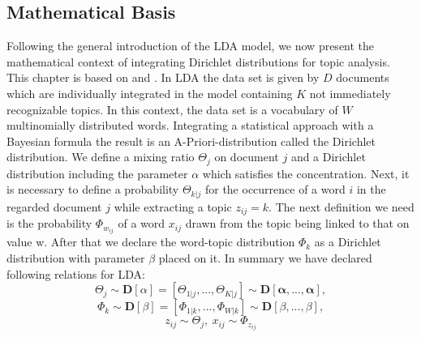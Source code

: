 \subsection{Mathematical Basis}
Following the general introduction of the LDA model, we now present the mathematical context of integrating Dirichlet distributions for topic analysis. This chapter is based on \citet{newman2009distributed} and \citet{teh2006hierarchical, teh2004sharing}. In LDA the data set is given by $D$ documents which are individually integrated in the model containing $K$ not immediately recognizable topics. In this context, the data set is a vocabulary of $W$ multinomially distributed words. Integrating a statistical approach with a Bayesian formula the result is an A-Priori-distribution called the Dirichlet distribution. We define a mixing ratio $\Theta_j$ on document $j$ and a Dirichlet distribution including the parameter $\alpha$ which satisfies the concentration.
Next, it is necessary to define a probability $\Theta_{k|j}$ for the occurrence of a word $i$ in the regarded document $j$ while extracting a topic $z_{ij}=k$. The next definition we need is the probability $\Phi_{w_{ij}}$ of a word $x_{ij}$ drawn from the topic being linked to that on value w. After that we declare the word-topic distribution $\Phi_k$ as a Dirichlet distribution with parameter $\beta$ placed on it. In summary we have declared following relations for LDA:
\begin{equation}\label{eq:lda_first}
    \Theta_j\sim\mathbf{D}[\alpha] = [\Theta_{1|j},...,\Theta_{K|j}]\sim\mathbf{D[\alpha,...,\alpha]},
\end{equation}
\begin{equation}\label{eq:lda_second}
    \Phi_k\sim\mathbf{D}[\beta] = [\Phi_{1|k},...,\Phi_{W|k}]\sim\mathbf{D}[\beta,...,\beta],
\end{equation}
\begin{equation}\label{eq:lda_third}
    z_{ij}\sim\Theta_j,\ x_{ij}\sim\Phi_{z_{ij}}
\end{equation}

